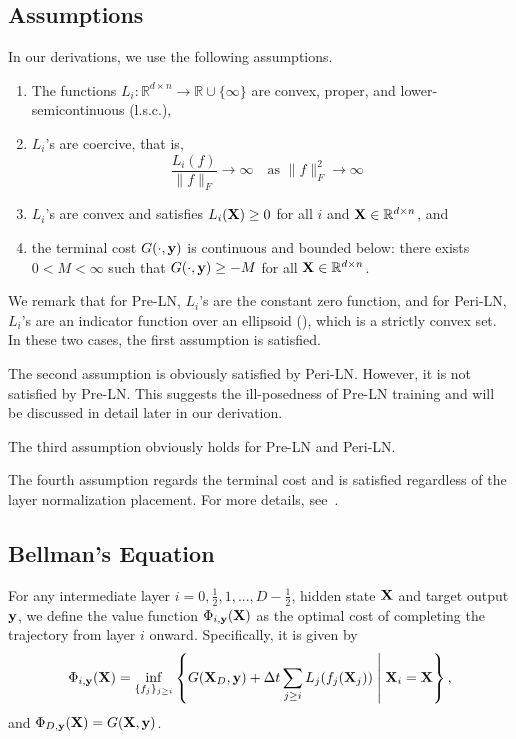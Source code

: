 \documentclass[journal]{IEEEtran}
\newcommand{\bfX}{{\bf X}}
\newcommand{\bfy}{ {\bf y}}
\theoremstyle{plain}
\theoremstyle{definition}
\theoremstyle{remark}
\begin{document}
\subsection{Assumptions}
In our derivations, we use the following assumptions.
\begin{enumerate}[label=(A\arabic*)]
    \item \label{assump:one}The functions $L_i: \mathbb{R}^{d\times n} \to \mathbb{R} \cup \{\infty\}$ are convex, proper, and lower-semicontinuous (l.s.c.),
    \item \label{assump:two}$L_i$'s are coercive, that is,
    \[
    \frac{L_i(f)}{\| f\|_F} \to \infty \quad \text{as $\| f\|_F^2 \to \infty$ }
    \]
    \item \label{assump:three}$L_i$'s are convex and satisfies $L_i(\bfX) \geq 0$ for all $i$ and $\bfX \in \mathbb{R}^{d \times n}$, and 
    \item \label{assump:four}the terminal cost $G(\cdot, \bfy)$ is continuous and bounded below: there exists $0< M < \infty$ such that $G(\cdot, \bfy) \geq -M$ for all $\bfX \in \mathbb{R}^{d \times n}$.
\end{enumerate}
We remark that for Pre-LN, $L_i$'s are the constant zero function, and for Peri-LN, $L_i$'s are an indicator function over an ellipsoid (), which is a strictly convex set. In these two cases, the first assumption is satisfied. 

The second assumption is obviously satisfied by Peri-LN. However, it is not satisfied by Pre-LN. This suggests the ill-posedness of Pre-LN training and will be discussed in detail later in our derivation.

The third assumption obviously holds for Pre-LN and Peri-LN.

The fourth assumption regards the terminal cost and is satisfied regardless of the layer normalization placement. For more details, see~\cite[Appendix F.1]{kan2025optimal}.

\subsection{Bellman's Equation}
For any intermediate layer $i=0,\frac{1}{2},1,...,D-\frac{1}{2}$, hidden state $\bfX$ and target output $\bfy$, we define the value function $\Phi_{i, \bfy}(\bfX)$ as the optimal cost of completing the trajectory from layer $i$ onward. Specifically, it is given by
\begin{equation}\label{eq:value_function}
    \Phi_{i, \bfy}(\bfX) = \inf_{\{ f_j\}_{j \geq i} } \left\{ G(\bfX_D, \bfy) + \Delta t \sum_{j \geq i} L_j(f_j(\bfX_j)) \; \middle| \; \bfX_i=\bfX \right\},
\end{equation}
and $\Phi_{D, \bfy}(\bfX) = G(\bfX, \bfy)$.
\end{document}
